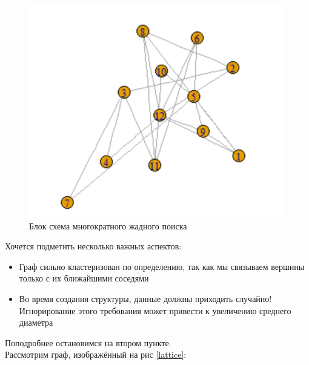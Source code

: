 \begin{figure}[H]
    \centering
    \includegraphics[scale=0.3]{./pictures/random_graph.png}
    \caption{Блок схема многократного жадного поиска} \label{Ponomarenko_graph_block_scheme}
\end{figure}

Хочется подметить несколько важных аспектов:
\begin{itemize}
    \item Граф сильно кластеризован по определению, так как мы связываем вершины только 
    с их ближайшими соседями
    \item Во время создания структуры, данные должны приходить случайно! Игнорирование 
    этого требования может привести к увеличению среднего диаметра
\end{itemize}

Поподробнее остановимся на втором пункте. \\ 
Рассмотрим граф, изображённый на рис \ref{lattice}:

